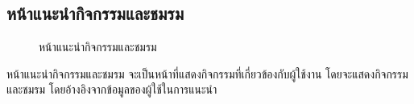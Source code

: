 \documentclass[14pt,oneside,openright,a4paper]{cpe-thai-project}
\begin{document}
\subsection{หน้าแนะนำกิจกรรมและชมรม}
\begin{figure}[!h]\centering
  \setlength{\fboxrule}{0.5mm} %
  \setlength{\fboxsep}{0.5cm}
  \caption{หน้าแนะนำกิจกรรมและชมรม}\label{fig:ui2}
\end{figure}
\hspace*{1cm} หน้าแนะนำกิจกรรมและชมรม จะเป็นหน้าที่แสดงกิจกรรมที่เกี่ยวข้องกับผู้ใช้งาน โดยจะแสดงกิจกรรม และชมรม โดยอ้างอิงจากข้อมูลของผู้ใช้ในการแนะนำ

\newpage
\end{document}
